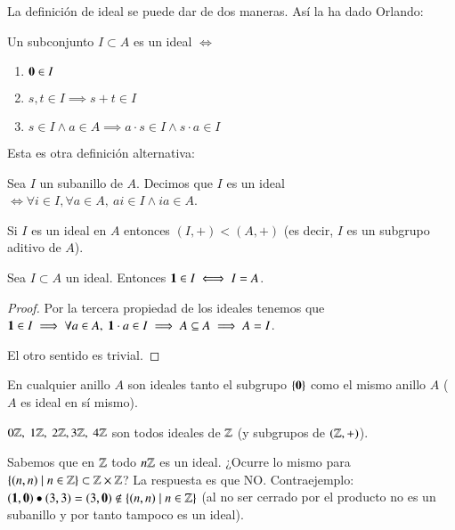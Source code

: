La definición de ideal se puede dar de dos maneras. Así la ha dado Orlando:

\begin{dfn}[Ideal]
	\label{dfn:idealorlando}
	Un subconjunto $I \subset A$ es un ideal $\iff$
	\begin{enumerate}
		\item $\mathbf{0} \in I$
		\item $s,t \in I \implies s+t \in I$
		\item $s \in I \land a \in A \implies a \cdot s \in I \land s \cdot a \in I$
	\end{enumerate}
\end{dfn}

Esta es otra definición alternativa:

\begin{dfn}
	\label{dfn:idealdorronsoro}
	Sea $I$ un subanillo de $A$. Decimos que $I$ es un ideal $\iff \forall i \in I, \forall a \in A,\ ai \in I \land ia \in A$.
\end{dfn}

\begin{pro}
	Si $I$ es un ideal en $A$ entonces $(I, +) < (A, +)$ (es decir, $I$ es un subgrupo aditivo de $A$).
\end{pro}

\begin{pro}
	Sea $I \subset A$ un ideal. Entonces $\mathbf{1} \in I \iff I = A$.
\end{pro}

\begin{proof}
	Por la tercera propiedad de los ideales tenemos que $\mathbf{1} \in I \implies \forall a \in A,\ \mathbf{1} \cdot a \in I \implies A \subseteq A \implies A = I$.
	
	El otro sentido es trivial.
\end{proof}

\begin{ej}
	En cualquier anillo $A$ son ideales tanto el subgrupo $\{\mathbf{0}\}$ como el mismo anillo $A$ ($A$ es ideal en sí mismo).
\end{ej}

\begin{ej}
	$0\mathbb{Z},\ 1\mathbb{Z},\ 2\mathbb{Z}, 3\mathbb{Z},\ 4\mathbb{Z}$ son todos ideales de $\mathbb{Z}$ (y subgrupos de $(\mathbb{Z}, +)$).
\end{ej}

\begin{ej}
	Sabemos que en $\mathbb{Z}$ todo $n\mathbb{Z}$ es un ideal. ¿Ocurre lo mismo para $\{(n,n) \mid n \in \mathbb{Z}\} \subset \mathbb{Z} \times \mathbb{Z}$? La respuesta es que NO. Contraejemplo: $(\mathbf{1},\mathbf{0}) \bullet (3,3) = (3,\mathbf{0}) \notin \{(n,n) \mid n \in \mathbb{Z}\}$ (al no ser cerrado por el producto no es un subanillo y por tanto tampoco es un ideal).
\end{ej}

